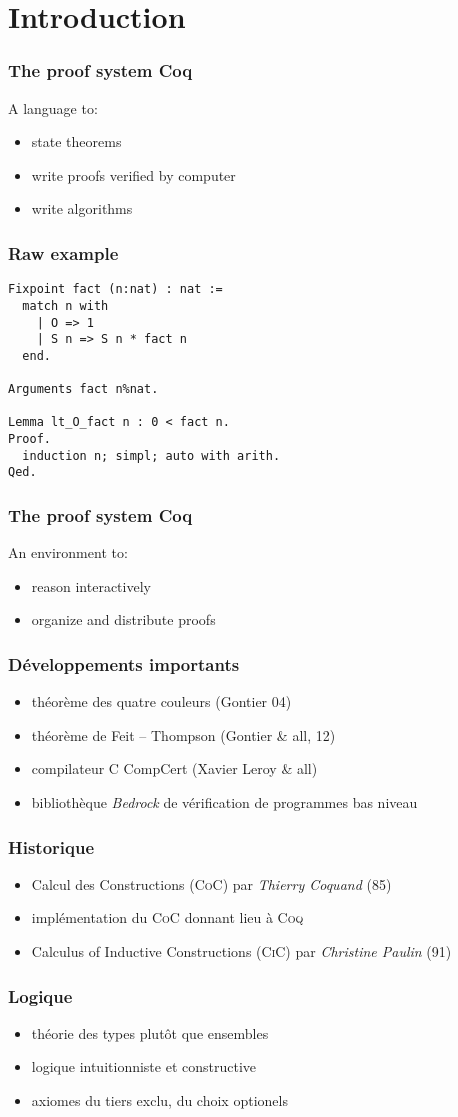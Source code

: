 \section{Introduction}
\begin{frame}
  \frametitle{The proof system Coq}
  A language to:
  \begin{itemize}
    \item state theorems
    \item write proofs verified by computer
    \item write algorithms
  \end{itemize}
\end{frame}

\begin{frame}[fragile]
  \frametitle{Raw example}
  \begin{verbatim}
Fixpoint fact (n:nat) : nat :=
  match n with
    | O => 1
    | S n => S n * fact n
  end.

Arguments fact n%nat.

Lemma lt_O_fact n : 0 < fact n.
Proof.
  induction n; simpl; auto with arith.
Qed.
  \end{verbatim}
\end{frame}

\begin{frame}
  \frametitle{The proof system Coq}
  An environment to:
  \begin{itemize}
    \item reason interactively
    \item organize and distribute proofs
  \end{itemize}
\end{frame}

\begin{frame}
  \frametitle{Développements importants}
  \begin{itemize}
    \item théorème des quatre couleurs (Gontier 04)
    \item théorème de Feit -- Thompson (Gontier \& all, 12)
    \item compilateur \textsc{C} CompCert (Xavier Leroy \& all)
    \item bibliothèque \emph{Bedrock} de vérification de programmes bas niveau
  \end{itemize}
\end{frame}

\begin{frame}
  \frametitle{Historique}
  \begin{itemize}
    \item Calcul des Constructions (\textsc{CoC}) par \emph{Thierry Coquand} (85)
    \item implémentation du \textsc{CoC} donnant lieu à \textsc{Coq}
    \item Calculus of Inductive Constructions (\textsc{CiC}) par \emph{Christine Paulin} (91)
  \end{itemize}
\end{frame}

\begin{frame}
  \frametitle{Logique}
  \begin{itemize}
    \item théorie des types plutôt que ensembles
    \item logique intuitionniste et constructive
    \item axiomes du tiers exclu, du choix optionels
  \end{itemize}
\end{frame}
